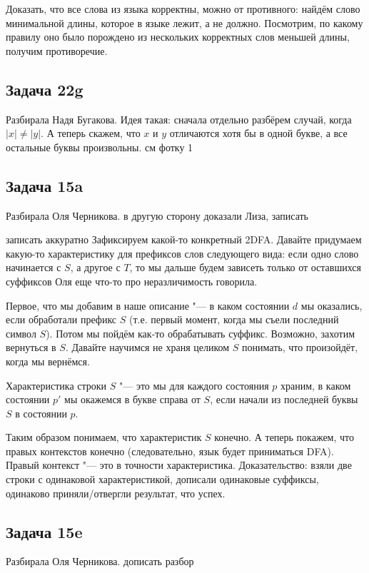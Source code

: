 		Доказать, что все слова из языка корректны, можно от противного: найдём слово
		минимальной длины, которое в языке лежит, а не должно.
		Посмотрим, по какому правилу оно было порождено из нескольких корректных слов меньшей длины,
		получим противоречие.

\subsection{Задача 22g}
	Разбирала Надя Бугакова.
	Идея такая: сначала отдельно разбёрем случай, когда $|x|\neq |y|$.
	А теперь скажем, что $x$ и $y$ отличаются хотя бы в одной букве,
	а все остальные буквы произвольны.
	\TODO см фотку 1

\subsection{Задача 15a}
	Разбирала Оля Черникова.
	\TODO в другую сторону доказали Лиза, записать

	\TODO записать аккуратно
	Зафиксируем какой-то конкретный 2DFA.
	Давайте придумаем какую-то характеристику для префиксов слов следующего вида:
	если одно слово начинается с $S$, а другое с $T$, то мы дальше будем зависеть только от
	оставшихся суффиксов \TODO Оля еще что-то про неразличимость говорила.

	Первое, что мы добавим в наше описание "--- в каком состоянии $d$ мы оказались, если
	обработали префикс $S$ (т.е. первый момент, когда мы съели последний символ $S$).
	Потом мы пойдём как-то обрабатывать суффикс.
	Возможно, захотим вернуться в $S$.
	Давайте научимся не храня целиком $S$ понимать, что произойдёт, когда мы вернёмся.

	Характеристика строки $S$ "--- это мы для каждого состояния $p$ храним, в каком состоянии
	$p'$ мы окажемся в букве справа от $S$, если начали из последней буквы $S$ в состоянии $p$.

	Таким образом понимаем, что характеристик $S$ конечно.
	А теперь покажем, что правых контекстов конечно (следовательно, язык будет приниматься DFA).
	Правый контекст "--- это в точности характеристика.
	Доказательство: взяли две строки с одинаковой характеристикой, дописали одинаковые суффиксы,
	одинаково приняли/отвергли результат, что успех.

\subsection{Задача 15e}
	Разбирала Оля Черникова.
	\TODO дописать разбор

